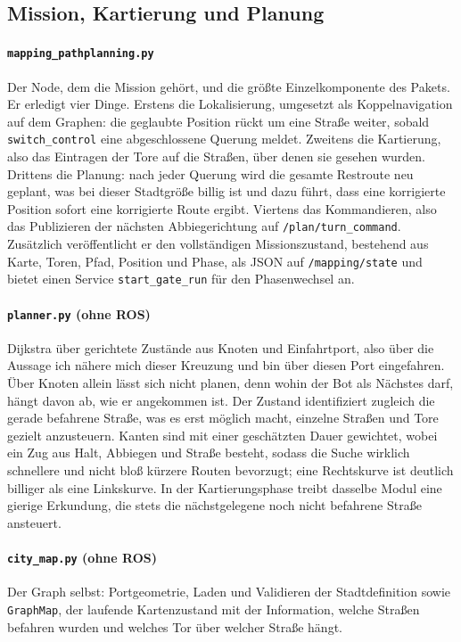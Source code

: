 \documentclass[10pt,a4paper]{article}
\begin{document}
\subsection{Mission, Kartierung und Planung}

\paragraph{\texttt{mapping\_pathplanning.py}} Der Node, dem die Mission gehört,
und die größte Einzelkomponente des Pakets. Er erledigt vier Dinge. Erstens die
Lokalisierung, umgesetzt als Koppelnavigation auf dem Graphen: die geglaubte
Position rückt um eine Straße weiter, sobald \texttt{switch\_control} eine
abgeschlossene Querung meldet. Zweitens die Kartierung, also das Eintragen der
Tore auf die Straßen, über denen sie gesehen wurden. Drittens die Planung: nach
jeder Querung wird die gesamte Restroute neu geplant, was bei dieser Stadtgröße
billig ist und dazu führt, dass eine korrigierte Position sofort eine
korrigierte Route ergibt. Viertens das Kommandieren, also das Publizieren der
nächsten Abbiegerichtung auf \texttt{/plan/turn\_command}. Zusätzlich
veröffentlicht er den vollständigen Missionszustand, bestehend aus Karte,
Toren, Pfad, Position und Phase, als JSON auf \texttt{/mapping/state} und bietet
einen Service \texttt{start\_gate\_run} für den Phasenwechsel an.

\paragraph{\texttt{planner.py} (ohne ROS)} Dijkstra über gerichtete Zustände
aus Knoten und Einfahrtport, also über die Aussage \glqq ich nähere mich dieser
Kreuzung und bin über diesen Port eingefahren\grqq. Über Knoten allein lässt
sich nicht planen, denn wohin der Bot als Nächstes darf, hängt davon ab, wie er
angekommen ist. Der Zustand identifiziert zugleich die gerade befahrene Straße,
was es erst möglich macht, einzelne Straßen und Tore gezielt anzusteuern.
Kanten sind mit einer geschätzten Dauer gewichtet, wobei ein Zug aus Halt,
Abbiegen und Straße besteht, sodass die Suche wirklich schnellere und nicht
bloß kürzere Routen bevorzugt; eine Rechtskurve ist deutlich billiger als eine
Linkskurve. In der Kartierungsphase treibt dasselbe Modul eine gierige
Erkundung, die stets die nächstgelegene noch nicht befahrene Straße ansteuert.

\paragraph{\texttt{city\_map.py} (ohne ROS)} Der Graph selbst: Portgeometrie,
Laden und Validieren der Stadtdefinition sowie \texttt{GraphMap}, der laufende
Kartenzustand mit der Information, welche Straßen befahren wurden und welches
Tor über welcher Straße hängt.
\end{document}
